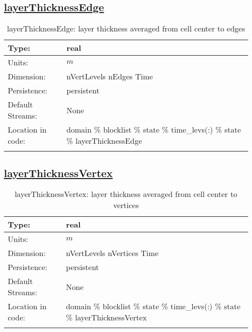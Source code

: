 \subsection[layerThicknessEdge]{\hyperref[sec:var_tab_state]{layerThicknessEdge}}
\label{subsec:var_sec_state_layerThicknessEdge}
\begin{center}
\begin{longtable}{| p{2.0in} | p{4.0in} |}
        \hline 
        Type: & real \\
        \hline 
        Units: & $m$ \\
        \hline 
        Dimension: & nVertLevels nEdges Time \\
        \hline 
        Persistence: & persistent \\
        \hline 
		 Default Streams: & None \\
        \hline 
		 Location in code: & domain \% blocklist \% state \% time\_levs(:) \% state \% layerThicknessEdge \\
		 \hline 
    \caption{layerThicknessEdge: layer thickness averaged from cell center to edges}
\end{longtable}
\end{center}
\subsection[layerThicknessVertex]{\hyperref[sec:var_tab_state]{layerThicknessVertex}}
\label{subsec:var_sec_state_layerThicknessVertex}
\begin{center}
\begin{longtable}{| p{2.0in} | p{4.0in} |}
        \hline 
        Type: & real \\
        \hline 
        Units: & $m$ \\
        \hline 
        Dimension: & nVertLevels nVertices Time \\
        \hline 
        Persistence: & persistent \\
        \hline 
		 Default Streams: & None \\
        \hline 
		 Location in code: & domain \% blocklist \% state \% time\_levs(:) \% state \% layerThicknessVertex \\
		 \hline 
    \caption{layerThicknessVertex: layer thickness averaged from cell center to vertices}
\end{longtable}
\end{center}
